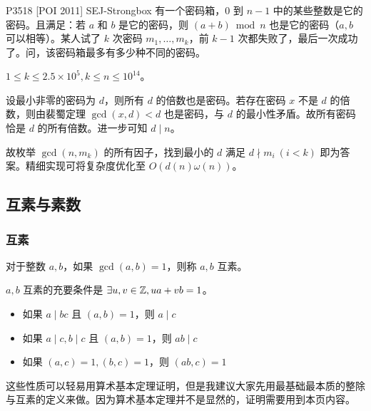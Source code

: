 \documentclass[../main.tex]{subfiles}
\begin{document}
\subsubsection{}

\begin{frame}{P3518 [POI 2011] SEJ-Strongbox}
有一个密码箱，$0$ 到 $n-1$ 中的某些整数是它的密码。且满足：若 $a$ 和 $b$ 是它的密码，则 $(a+b)\bmod n$ 也是它的密码（$a,b$ 可以相等）。某人试了 $k$ 次密码 $m_1,\dots,m_k$，前 $k-1$ 次都失败了，最后一次成功了。问，该密码箱最多有多少种不同的密码。

$1\le k\le 2.5\times 10^5,k\le n\le 10^{14}$。
\end{frame}

\begin{frame}
设最小非零的密码为 $d$，则所有 $d$ 的倍数也是密码。若存在密码 $x$ 不是 $d$ 的倍数，则由裴蜀定理 $\gcd(x,d)<d$ 也是密码，与 $d$ 的最小性矛盾。故所有密码恰是 $d$ 的所有倍数。进一步可知 $d\mid n$。 \pause

故枚举 $\gcd(n,m_k)$ 的所有因子，找到最小的 $d$ 满足 $d\nmid m_i\ (i<k)$ 即为答案。精细实现可将复杂度优化至 $O(d(n)\omega(n))$。
\end{frame}

\subsection{互素与素数}

\subsubsection{互素}

\begin{frame}
\begin{defi}[互素]
对于整数 $a,b$，如果 $\gcd(a,b)=1$，则称 $a,b$ 互素。
\end{defi} \pause

$a,b$ 互素的充要条件是 $\exists u,v\in \mathbb{Z},ua+vb=1$。 \pause

\begin{theo}
\begin{itemize}
\item 如果 $a\mid bc$ 且 $(a,b)=1$，则 $a\mid c$ \pause
\item 如果 $a\mid c,b\mid c$ 且 $(a,b)=1$，则 $ab\mid c$ \pause
\item 如果 $(a,c)=1,(b,c)=1$，则 $(ab,c)=1$
\end{itemize}
\end{theo} \pause

这些性质可以轻易用算术基本定理证明，但是我建议大家先用最基础最本质的整除与互素的定义来做。因为算术基本定理并不是显然的，证明需要用到本页内容。
\end{frame}
\end{document}

